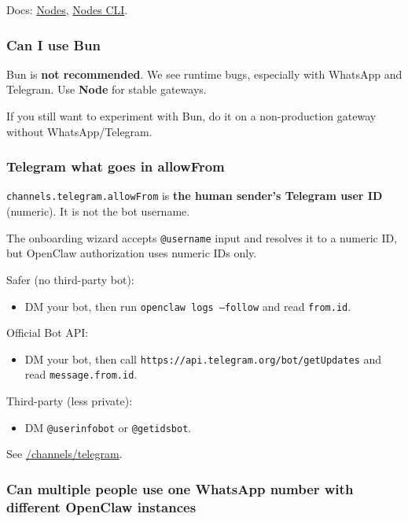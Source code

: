 Docs: \href{/nodes}{Nodes}, \href{/cli/nodes}{Nodes CLI}.

\subsubsection{Can I use Bun}


Bun is \textbf{not recommended}. We see runtime bugs, especially with WhatsApp and Telegram.
Use \textbf{Node} for stable gateways.

If you still want to experiment with Bun, do it on a non-production gateway
without WhatsApp/Telegram.

\subsubsection{Telegram what goes in allowFrom}


\texttt{channels.telegram.allowFrom} is \textbf{the human sender's Telegram user ID} (numeric). It is not the bot username.

The onboarding wizard accepts \texttt{@username} input and resolves it to a numeric ID, but OpenClaw authorization uses numeric IDs only.

Safer (no third-party bot):

\begin{itemize}
  \item DM your bot, then run \texttt{openclaw logs --follow} and read \texttt{from.id}.
\end{itemize}


Official Bot API:

\begin{itemize}
  \item DM your bot, then call \texttt{https://api.telegram.org/bot/getUpdates} and read \texttt{message.from.id}.
\end{itemize}


Third-party (less private):

\begin{itemize}
  \item DM \texttt{@userinfobot} or \texttt{@getidsbot}.
\end{itemize}


See \href{/channels/telegram\#access-control-dms--groups}{/channels/telegram}.

\subsubsection{Can multiple people use one WhatsApp number with different OpenClaw instances}


